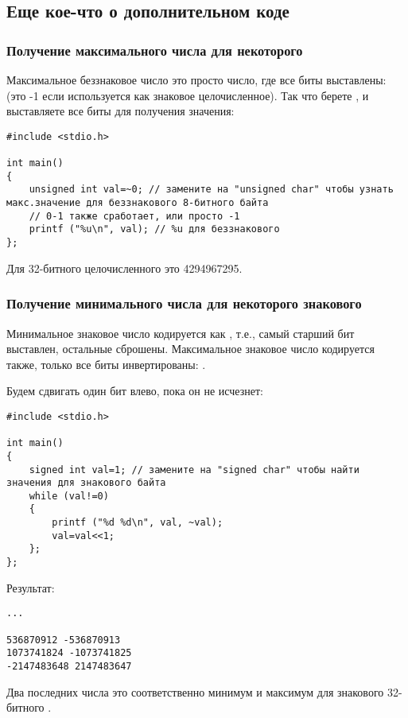 \subsection{Еще кое-что о дополнительном коде}

\subsubsection{Получение максимального числа для некоторого }

Максимальное беззнаковое число это просто число, где все биты выставлены: 
(это -1 если  используется как знаковое целочисленное).
Так что берете , и выставляете все биты для получения значения:

\begin{lstlisting}[style=customc]
#include <stdio.h>

int main()
{
	unsigned int val=~0; // замените на "unsigned char" чтобы узнать макс.значение для беззнакового 8-битного байта
	// 0-1 также сработает, или просто -1
	printf ("%u\n", val); // %u для беззнакового
};
\end{lstlisting}

Для 32-битного целочисленного это 4294967295.

\subsubsection{Получение минимального числа для некоторого знакового }

Минимальное знаковое число кодируется как , т.е., самый старший бит выставлен, остальные сброшены.
Максимальное знаковое число кодируется также, только все биты инвертированы: .

Будем сдвигать один бит влево, пока он не исчезнет:

\begin{lstlisting}[style=customc]
#include <stdio.h>

int main()
{
	signed int val=1; // замените на "signed char" чтобы найти значения для знакового байта
	while (val!=0)
	{
		printf ("%d %d\n", val, ~val);
		val=val<<1;
	};
};
\end{lstlisting}

Результат:

\begin{lstlisting}
...

536870912 -536870913
1073741824 -1073741825
-2147483648 2147483647
\end{lstlisting}

Два последних числа это соответственно минимум и максимум для знакового 32-битного .

